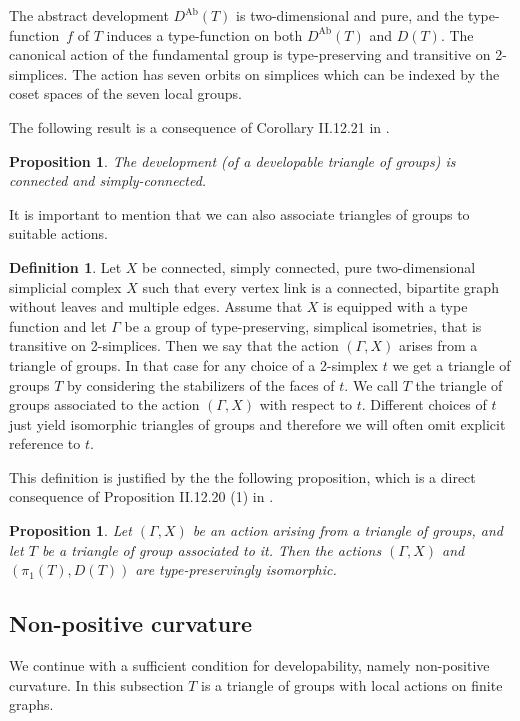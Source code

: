 \documentclass[dvipsnames]{article}
\newtheorem{proposition}[theorem]{Proposition}
\theoremstyle{definition}
\newtheorem{definition}[theorem]{Definition}
\theoremstyle{remark}
\DeclareMathOperator{\Ab}{Ab}
\begin{document}
    The abstract development $D^{\Ab}(T)$ is two-dimensional and pure, and the type-function~$f$ of $T$ induces a type-function on both $D^{\Ab}(T)$ and $D(T)$.
    The canonical action of the fundamental group is type-preserving and transitive on 2-simplices.
    The action has seven orbits on simplices which can be indexed by the coset spaces of the seven local groups.

    The following result is a consequence of Corollary II.12.21 in \cite{BridsonHaefliger}.

    \begin{proposition}
        The development (of a developable triangle of groups) is connected and simply-connected.
    \end{proposition}

    It is important to mention that we can also associate triangles of groups to suitable actions. 

    \begin{definition}\label{def:action_from_triangle}
        Let $X$ be connected, simply connected, pure two-dimensional simplicial complex $X$ such that every vertex link is a connected, bipartite graph without leaves and multiple edges. Assume that $X$ is equipped with a type function and let $\Gamma$ be a group of type-preserving, simplical isometries, that is transitive on 2-simplices.
        Then we say that the action $(\Gamma, X)$ arises from a triangle of groups.
        In that case for any choice of a 2-simplex $t$ we get a triangle of groups $T$ by considering the stabilizers of the faces of $t$. We call $T$ the triangle of groups associated to the action $(\Gamma,X)$ with respect to $t$.
        Different choices of $t$ just yield isomorphic triangles of groups and therefore we will often omit explicit reference to $t$.
    \end{definition}

    This definition is justified by the the following proposition, which is a direct consequence of Proposition II.12.20 (1) in \cite{BridsonHaefliger}.

    \begin{proposition}\label{prop:uniqueness_dev}
        Let $(\Gamma, X)$ be an action arising from a triangle of groups, and let $T$ be a triangle of group associated to it. Then the actions $(\Gamma, X)$ and $(\pi_1(T), D(T))$ are type-preservingly isomorphic.
    \end{proposition}

    \subsection{Non-positive curvature}
    We continue with a sufficient condition for developability, namely non-positive curvature.
    In this subsection $T$ is a triangle of groups with local actions on finite graphs.
         
\end{document}
